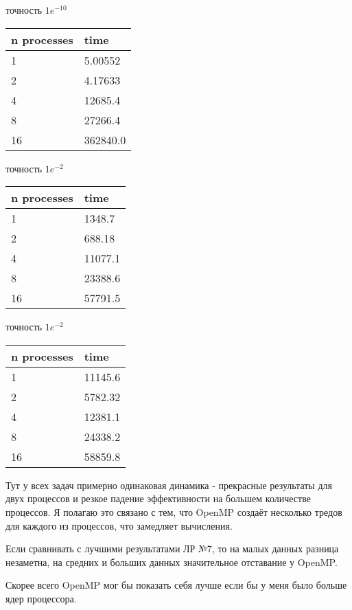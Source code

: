 \documentclass[12pt]{article}
\begin{document}
\begin{table*}[!ht]
	\begin{minipage}{.49\linewidth}
		\centering
		\caption*{Область 8x8x8}
		точность $1e^{-10}$
		\begin{tabularx}{\linewidth}{|X|X|}
			\hline
			n processes & time     \\
			\hline
			1           & 5.00552  \\
			2           & 4.17633  \\
			4           & 12685.4  \\
			8           & 27266.4  \\
			16          & 362840.0 \\
			\hline
		\end{tabularx}
	\end{minipage}%
	\begin{minipage}{.49\linewidth}
		\centering
		\caption*{Область 64x64x64}
		точность $1e^{-2}$
		\begin{tabularx}{\linewidth}{|X|X|}
			\hline
			n processes & time    \\
			\hline
			1           & 1348.7  \\
			2           & 688.18  \\
			4           & 11077.1 \\
			8           & 23388.6 \\
			16          & 57791.5 \\
			\hline
		\end{tabularx}
	\end{minipage}

	\centering

	\begin{minipage}{.49\linewidth}
		\centering
		\caption*{Область 128x128x128}
		точность $1e^{-2}$
		\begin{tabularx}{\linewidth}{|X|X|}
			\hline
			n processes & time    \\
			\hline
			1           & 11145.6 \\
			2           & 5782.32 \\
			4           & 12381.1 \\
			8           & 24338.2 \\
			16          & 58859.8 \\
			\hline
		\end{tabularx}
	\end{minipage}%
\end{table*}

Тут у всех задач примерно одинаковая динамика - прекрасные результаты для двух процессов и резкое падение
эффективности на большем количестве процессов. Я полагаю это связано с тем, что OpenMP создаёт несколько тредов
для каждого из процессов, что замедляет вычисления.

Если сравнивать с лучшими результатами ЛР №7, то на малых данных разница незаметна,
на средних и больших данных значительное отставание у OpenMP.

Скорее всего OpenMP мог бы показать себя лучше если бы у меня было больше ядер процессора.

\end{document}
